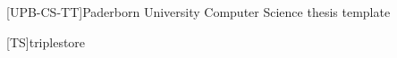 \theoremstyle{plain}
\newtheorem{definition}{Definition}[chapter]
\newtheorem{lemma}[definition]{Lemma}
\ifgerman
	\newtheorem{theorem}[definition]{Satz}
	\newtheorem{corollary}[definition]{Korollar}
	\newtheorem{example}[definition]{Beispiel}
\else
	\newtheorem{theorem}[definition]{Theorem}
	\newtheorem{corollary}[definition]{Corollary}
	\newtheorem{example}[definition]{Example}
\fi



\newcommand*{\eg}{e.\,g.}
\newcommand*{\ie}{i.\,e.}
\newcommand*{\cf}{c.\,f.}
\newcommand*{\etal}{et~al.}

[UPB-CS-TT]{Paderborn University Computer Science thesis template}

\DeclareMathOperator{\testop}{top}

[TS]{triplestore}

\newcommand*{\ts}{\acl*{ts}}
\newcommand*{\tsp}{\aclp*{ts}}

\newcommand*{\iguana}{\textsc{Iguana}}
\newcommand*{\tentris}{\textsc{Tentris}}


\newcommand*{\gh}{GitHub}
\newcommand*{\dockh}{Docker Hub}

\lstset{
	basicstyle=\scriptsize\ttfamily,
	numbers=left
}
